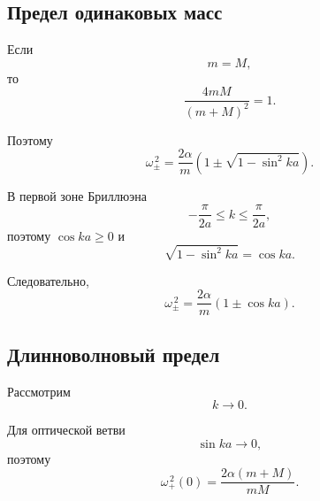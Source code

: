 \documentclass[../final.tex]{subfiles}
\begin{document}

\subsection*{Предел одинаковых масс}

Если
%
\begin{equation*}
    m=M,
\end{equation*}
%
то
%
\begin{equation*}
    \frac{4mM}{(m+M)^2}=1.
\end{equation*}
%

Поэтому
%
\begin{equation*}
    \omega_\pm^{\,2}
    =
    \frac{2\alpha}{m}
    \left(
        1
        \pm
        \sqrt{
            1-\sin^2ka
        }
    \right).
\end{equation*}
%

В первой зоне Бриллюэна
%
\begin{equation*}
    -\frac{\pi}{2a}
    \leq
    k
    \leq
    \frac{\pi}{2a},
\end{equation*}
%
поэтому $\cos ka\geq0$ и
%
\begin{equation*}
    \sqrt{1-\sin^2ka}
    =
    \cos ka.
\end{equation*}
%

Следовательно,
%
\begin{equation*}
    \omega_\pm^{\,2}
    =
    \frac{2\alpha}{m}
    \left(
        1\pm\cos ka
    \right).
\end{equation*}



\subsection*{Длинноволновый предел}

Рассмотрим
%
\begin{equation*}
    k\to0.
\end{equation*}
%

Для оптической ветви
%
\begin{equation*}
    \sin ka\to0,
\end{equation*}
%
поэтому
%
\begin{equation*}
    \omega_+^{\,2}(0)
    =
    \frac{2\alpha(m+M)}{mM}.
\end{equation*}
%
\end{document}
